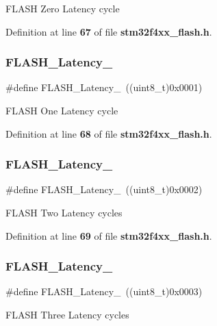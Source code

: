 F\+L\+A\+SH Zero Latency cycle 

Definition at line \textbf{ 67} of file \textbf{ stm32f4xx\+\_\+flash.\+h}.

\mbox{\label{group__Flash__Latency_ga6b7281665340fe8f7919bdfcfd06f8e6}} 
\subsubsection{F\+L\+A\+S\+H\+\_\+\+Latency\+\_}
{\footnotesize\ttfamily \#define F\+L\+A\+S\+H\+\_\+\+Latency\+\_~((uint8\+\_\+t)0x0001)}

F\+L\+A\+SH One Latency cycle 

Definition at line \textbf{ 68} of file \textbf{ stm32f4xx\+\_\+flash.\+h}.

\mbox{\label{group__Flash__Latency_ga55173ebb5c978459ce18d5e2516e3e89}} 
\subsubsection{F\+L\+A\+S\+H\+\_\+\+Latency\+\_}
{\footnotesize\ttfamily \#define F\+L\+A\+S\+H\+\_\+\+Latency\+\_~((uint8\+\_\+t)0x0002)}

F\+L\+A\+SH Two Latency cycles 

Definition at line \textbf{ 69} of file \textbf{ stm32f4xx\+\_\+flash.\+h}.

\mbox{\label{group__Flash__Latency_ga13fbc5a6423848be5bf631dc437bbc3f}} 
\subsubsection{F\+L\+A\+S\+H\+\_\+\+Latency\+\_}
{\footnotesize\ttfamily \#define F\+L\+A\+S\+H\+\_\+\+Latency\+\_~((uint8\+\_\+t)0x0003)}

F\+L\+A\+SH Three Latency cycles 

